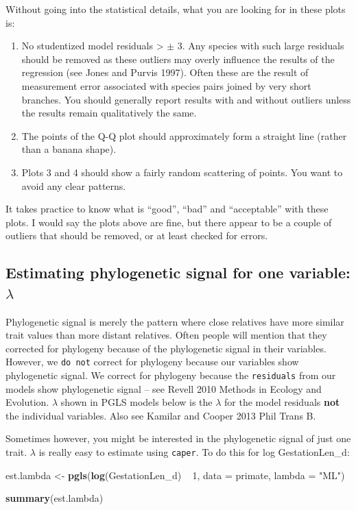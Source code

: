 \documentclass[12pt]{article}
\newcommand{\KeywordTok}[1]{\textcolor[rgb]{0.13,0.29,0.53}{\textbf{{#1}}}}
\newcommand{\DataTypeTok}[1]{\textcolor[rgb]{0.13,0.29,0.53}{{#1}}}
\newcommand{\DecValTok}[1]{\textcolor[rgb]{0.00,0.00,0.81}{{#1}}}
\newcommand{\StringTok}[1]{\textcolor[rgb]{0.31,0.60,0.02}{{#1}}}
\newcommand{\NormalTok}[1]{{#1}}
\begin{document}
\newpage
Without going into the statistical details, what you are looking for in these plots is:
\begin{enumerate}
\item No studentized model residuals > $\pm$ 3. 
Any species with such large residuals should be removed as these outliers may overly influence the results of the regression (see Jones and Purvis 1997). Often these are the result of measurement error associated with species pairs joined by very short branches. You should generally report results with and without outliers unless the results remain qualitatively the same.
\item The points of the Q-Q plot should approximately form a straight line (rather than a banana shape).
\item Plots 3 and 4 should show a fairly random scattering of points. You want to avoid any clear patterns.
\end{enumerate}

It takes practice to know what is ``good'', ``bad'' and ``acceptable'' with these plots. I would say the plots above are fine, but there appear to be a couple of outliers that should be removed, or at least checked for errors. 

\subsection{Estimating phylogenetic signal for one variable: $\lambda$}
Phylogenetic signal is merely the pattern where close relatives have more similar trait values than more distant relatives. Often people will mention that they corrected for phylogeny because of the phylogenetic signal in their variables. However, we \texttt{do not} correct for phylogeny because our variables show phylogenetic signal. We correct for phylogeny because the \texttt{residuals} from our models show phylogenetic signal – see Revell 2010 Methods in Ecology and Evolution. $\lambda$ shown in PGLS models below is the $\lambda$ for the model residuals \textbf{not} the individual variables. Also see Kamilar and Cooper 2013 Phil Trans B.

Sometimes however, you might be interested in the phylogenetic signal of just one trait. $\lambda$ is really easy to estimate using \texttt{caper}. To do this for log GestationLen\_d:

\begin{snugshade}
\begin{Highlighting}[]
\NormalTok{est.lambda <-}\StringTok{ }\KeywordTok{pgls}\NormalTok{(}\KeywordTok{log}\NormalTok{(GestationLen_d) ~}\StringTok{ }\DecValTok{1}\NormalTok{, }\DataTypeTok{data =} \NormalTok{primate, }\DataTypeTok{lambda =} \StringTok{"ML"}\NormalTok{)}

\KeywordTok{summary}\NormalTok{(est.lambda)}
\end{Highlighting}
\end{snugshade}
\end{document}
